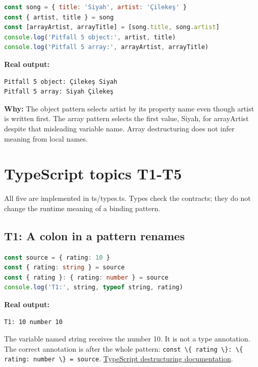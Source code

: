 \documentclass[
  10pt,
  a4paper,
  titlepage]{article}
\newcommand{\passthrough}[1]{#1}
\begin{document}
\Needspace{72.1pt}
\begin{lstlisting}[language=JavaScript]
const song = { title: 'Siyah', artist: 'Çilekeş' }
const { artist, title } = song
const [arrayArtist, arrayTitle] = [song.title, song.artist]
console.log('Pitfall 5 object:', artist, title)
console.log('Pitfall 5 array:', arrayArtist, arrayTitle)
\end{lstlisting}


\textbf{Real output:}

\Needspace{41.2pt}
\begin{lstlisting}
Pitfall 5 object: Çilekeş Siyah
Pitfall 5 array: Siyah Çilekeş
\end{lstlisting}

\textbf{Why:} The object pattern selects artist by its property name
even though artist is written first. The array pattern selects the first
value, Siyah, for arrayArtist despite that misleading variable name.
Array destructuring does not infer meaning from local names.

\section{TypeScript topics T1-T5}\label{typescript-topics-t1t5}

All five are implemented in ts/types.ts. Types check the contracts; they
do not change the runtime meaning of a binding pattern.

\subsection{T1: A colon in a pattern
renames}\label{t1-a-colon-in-a-pattern-renames}

\Needspace{61.8pt}
\begin{lstlisting}[language=TypeScript]
const source = { rating: 10 }
const { rating: string } = source
const { rating }: { rating: number } = source
console.log('T1:', string, typeof string, rating)
\end{lstlisting}


\textbf{Real output:}

\Needspace{30.9pt}
\begin{lstlisting}
T1: 10 number 10
\end{lstlisting}

The variable named string receives the number 10. It is not a type
annotation. The correct annotation is after the whole pattern:
\passthrough{\lstinline!const \{ rating \}: \{ rating: number \} = source!}.
\href{https://www.typescriptlang.org/docs/handbook/variable-declarations.html\#destructuring}{TypeScript
destructuring documentation}.
\end{document}
